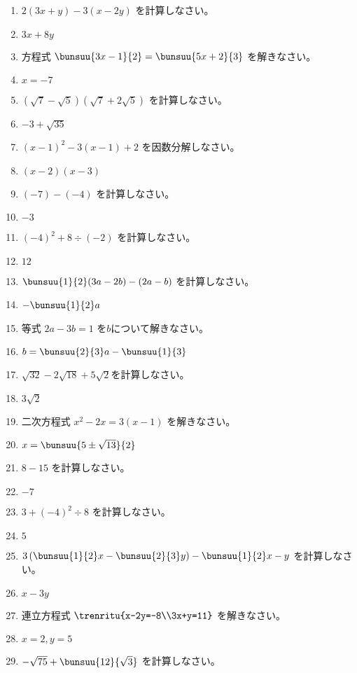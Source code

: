 \documentclass[uplatex,a4j,11pt]{jsreport}
\begin{document}
\begin{multicols}{2}
\begin{enumerate}
    \item $2(3x+y)-3(x-2y)$ を計算しなさい。%
    \item $3x+8y$
    \item 方程式 $\bunsuu{3x-1}{2}=\bunsuu{5x+2}{3}$ を解きなさい。%
    \item $x=-7$
    \item $(\sqrt{7}-\sqrt{5})(\sqrt{7}+2\sqrt{5})$ を計算しなさい。%
    \item $-3+\sqrt{35}$
    \item $(x-1)^2-3(x-1)+2$ を因数分解しなさい。%
    \item $(x-2)(x-3)$
    \item $(-7)-(-4)$ を計算しなさい。%
    \item $-3$
    \item $(-4)^2+8\div(-2)$ を計算しなさい。%
    \item $12$
    \item $\bunsuu{1}{2}(3a-2b)-(2a-b)$ を計算しなさい。%
    \item $-\bunsuu{1}{2}a$
    \item 等式 $2a-3b=1$ を$b$について解きなさい。%
    \item $b=\bunsuu{2}{3}a-\bunsuu{1}{3}$
    \item $\sqrt{32}-2\sqrt{18}+5\sqrt{2}$を計算しなさい。%
    \item $3\sqrt{2}$
    \item 二次方程式 $x^2-2x=3(x-1)$ を解きなさい。%
    \item $x=\bunsuu{5\pm\sqrt{13}}{2}$
    \item $8-15$ を計算しなさい。%
    \item $-7$
    \item $3+(-4)^2\div8$ を計算しなさい。%
    \item $5$
    \item $3\left(\bunsuu{1}{2}x-\bunsuu{2}{3}y\right)-\bunsuu{1}{2}x-y$ を計算しなさい。%
    \item $x-3y$
    \item 連立方程式 $\trenritu{x-2y=-8\\3x+y=11}$ を解きなさい。%
    \item $x=2, y=5$
    \item $-\sqrt{75}+\bunsuu{12}{\sqrt{3}}$ を計算しなさい。%

\end{enumerate}
\end{multicols}
\end{document}
